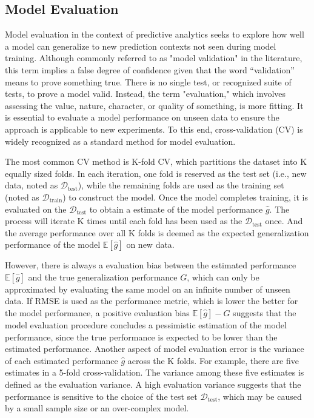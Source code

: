\subsection{Model Evaluation}

Model evaluation in the context of predictive analytics seeks to explore how well a model can generalize to new prediction contexts not seen during model training. Although commonly referred to as "model validation" in the literature, this term implies a false degree of confidence given that the word “validation” means to prove something true. There is no single test, or recognized suite of tests, to prove a model valid. Instead, the term "evaluation," which involves assessing the value, nature, character, or quality of something, is more fitting. It is essential to evaluate a model performance on unseen data to ensure the approach is applicable to new experiments. To this end, cross-validation (CV) is widely recognized as a standard method for model evaluation.

The most common CV method is K-fold CV, which partitions the dataset into K equally sized folds. In each iteration, one fold is reserved as the test set (i.e., new data, noted as $\mathcal{D}_{\text{test}}$), while the remaining folds are used as the training set (noted as $\mathcal{D}_{\text{train}}$) to construct the model. Once the model completes training, it is evaluated on the $\mathcal{D}_{\text{test}}$ to obtain a estimate of the model performance $\hat{g}$. The process will iterate K times until each fold has been used as the $\mathcal{D}_{\text{test}}$ once. And the average performance over all K folds is deemed as the expected generalization performance of the model $\mathbb{E}[\hat{g}]$ on new data.

However, there is always a evaluation bias between the estimated performance $\mathbb{E}[\hat{g}]$ and the true generalization performance $G$, which can only be approximated by evaluating the same model on an infinite number of unseen data. If RMSE is used as the performance metric, which is lower the better for the model performance, a positive evaluation bias $\mathbb{E}[\hat{g}] - G$ suggests that the model evaluation procedure concludes a pessimistic estimation of the model performance, since the true performance is expected to be lower than the estimated performance. Another aspect of model evaluation error is the variance of each estimated performance $\hat{g}$ across the K folds. For example, there are five estimates in a 5-fold cross-validation. The variance among these five estimates is defined as the evaluation variance. A high evaluation variance suggests that the performance is sensitive to the choice of the test set $\mathcal{D}_\text{test}$, which may be caused by a small sample size or an over-complex model.

